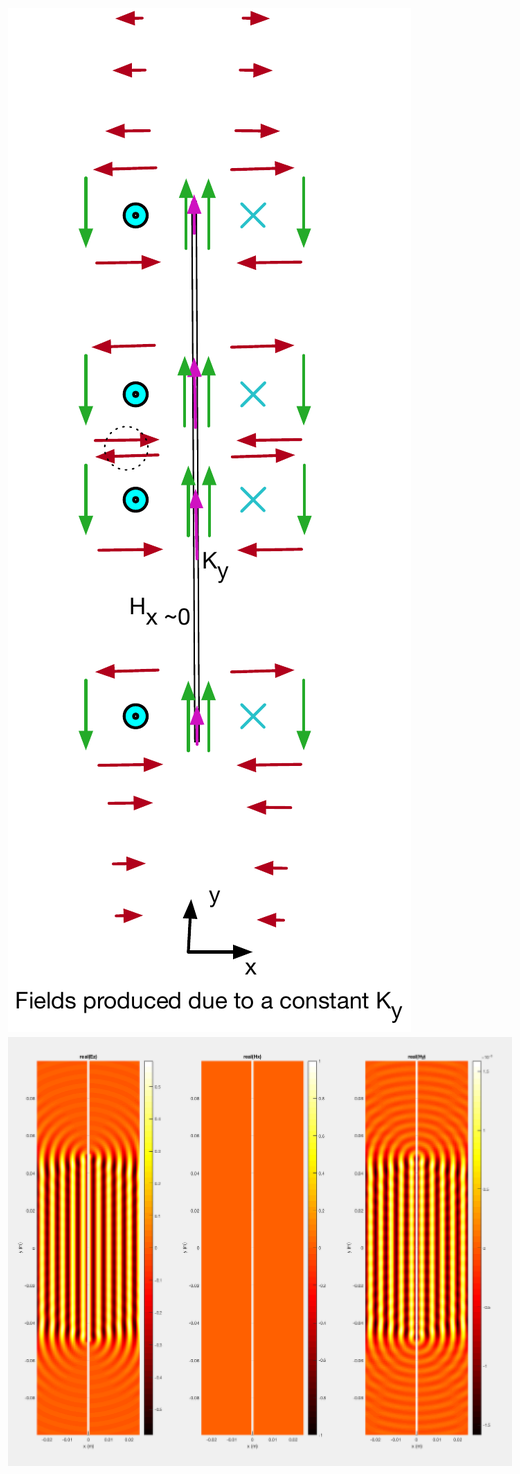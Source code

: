 \documentclass{article}
\newcommand{\0}{\varnothing}
\begin{document}
\begin{minipage}{0.45\textwidth}
\begin{center}
\includegraphics[width=0.24\columnwidth]{figures/OnlyKs}
\includegraphics[width=0.74\columnwidth]{figures/OnlyKsZeroDerv.png}
\end{center}
\end{minipage}
\end{document}
